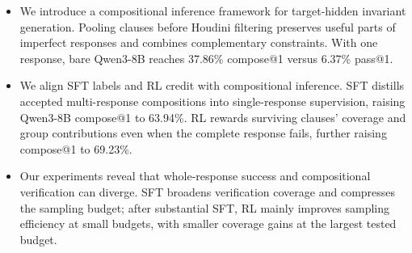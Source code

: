 

\begin{samepage}
\begin{itemize}
  \item We introduce a compositional inference framework for target-hidden
  invariant generation.  Pooling clauses before Houdini filtering preserves
  useful parts of imperfect responses and combines complementary constraints.
  With one response, bare Qwen3-8B reaches 37.86\% compose@1 versus
  6.37\% pass@1.
  \item We align SFT labels and RL credit with compositional inference.
  SFT distills accepted multi-response compositions into single-response
  supervision, raising Qwen3-8B compose@1 to 63.94\%.  RL rewards surviving
  clauses' coverage and group contributions even when the complete response
  fails, further raising compose@1 to 69.23\%.
  \item Our experiments reveal that whole-response success and compositional
  verification can diverge.  SFT broadens verification coverage and compresses
  the sampling budget; after substantial SFT, RL mainly improves sampling
  efficiency at small budgets, with smaller coverage gains at the largest
  tested budget.
\end{itemize}
\end{samepage}
